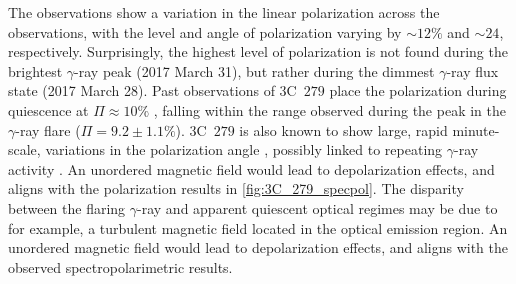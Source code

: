 The observations show a variation in the linear polarization across the observations, with the level and angle of polarization varying by $\sim 12\%$ and $\sim 24$\degree, respectively.  %
Surprisingly, the highest level of polarization is not found during the brightest $\gamma$-ray peak (2017 March 31), but rather during the dimmest $\gamma$-ray flux state (2017 March 28).
Past observations of 3C~$279$ place the polarization during quiescence at $\Pi \approx 10 \%$ \citep[see e.g.,][]{3C279_xray}, falling within the range observed during the peak in the $\gamma$-ray flare ($\Pi = 9.2 \pm 1.1\%$).
3C~$279$ is also known to show large, rapid minute-scale, variations in the polarization angle \citep{3C279_var}, possibly linked to repeating $\gamma$-ray activity \citep{3C279_repeat}.
An unordered magnetic field would lead to depolarization effects, and aligns with the polarization results in \autoref{fig:3C_279_specpol}.
The disparity between the flaring $\gamma$-ray and apparent quiescent optical regimes may be due to for example, a turbulent magnetic field located in the optical emission region.
An unordered magnetic field would lead to depolarization effects, and aligns with the observed spectropolarimetric results.




